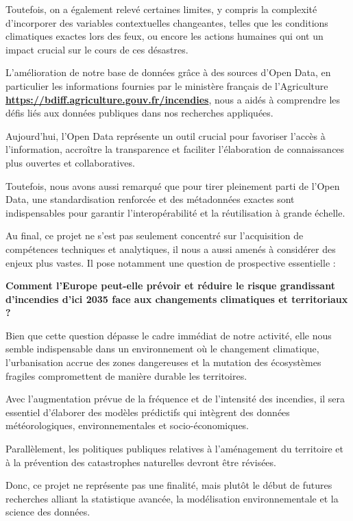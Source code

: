 \documentclass[
]{article}
\begin{document}
Toutefois, on a également relevé certaines limites, y compris la
complexité d'incorporer des variables contextuelles changeantes, telles
que les conditions climatiques exactes lors des feux, ou encore les
actions humaines qui ont un impact crucial sur le cours de ces
désastres.

L'amélioration de notre base de données grâce à des sources d'Open Data,
en particulier les informations fournies par le ministère français de
l'Agriculture
\textbf{\url{https://bdiff.agriculture.gouv.fr/incendies}}, nous a aidés
à comprendre les défis liés aux données publiques dans nos recherches
appliquées.

Aujourd'hui, l'Open Data représente un outil crucial pour favoriser
l'accès à l'information, accroître la transparence et faciliter
l'élaboration de connaissances plus ouvertes et collaboratives.

Toutefois, nous avons aussi remarqué que pour tirer pleinement parti de
l'Open Data, une standardisation renforcée et des métadonnées exactes
sont indispensables pour garantir l'interopérabilité et la réutilisation
à grande échelle.

Au final, ce projet ne s'est pas seulement concentré sur l'acquisition
de compétences techniques et analytiques, il nous a aussi amenés à
considérer des enjeux plus vastes. Il pose notamment une question de
prospective essentielle :

\textbf{Comment l'Europe peut-elle prévoir et réduire le risque
grandissant d'incendies d'ici 2035 face aux changements climatiques et
territoriaux ?}

Bien que cette question dépasse le cadre immédiat de notre activité,
elle nous semble indispensable dans un environnement où le changement
climatique, l'urbanisation accrue des zones dangereuses et la mutation
des écosystèmes fragiles compromettent de manière durable les
territoires.

Avec l'augmentation prévue de la fréquence et de l'intensité des
incendies, il sera essentiel d'élaborer des modèles prédictifs qui
intègrent des données météorologiques, environnementales et
socio-économiques.

Parallèlement, les politiques publiques relatives à l'aménagement du
territoire et à la prévention des catastrophes naturelles devront être
révisées.

Donc, ce projet ne représente pas une finalité, mais plutôt le début de
futures recherches alliant la statistique avancée, la modélisation
environnementale et la science des données.
\end{document}
